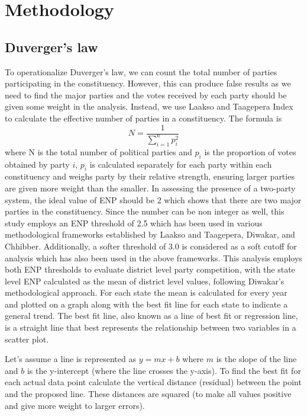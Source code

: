 \section{Methodology}
\subsection{Duverger's law}
To operationalize Duverger's law, we can count the total number of parties participating in the constituency. However, this can produce false results as we need to find the major parties and the votes received by each party should be given some weight in the analysis. Instead, we use Laakso and Taagepera Index \citep{laakso1979effective} to calculate the effective number of parties in a constituency. The formula is
\begin{equation*}
N = \frac{1}{\sum_{i=1}^{n} p_i^2}
\end{equation*}
where N is the total number of political parties and $p_i$ is the proportion of votes obtained by party $i$, $p_i$ is calculated separately for each party within each constituency and weighs party by their relative strength, ensuring larger parties are given more weight than the smaller. In assessing the presence of a two-party system, the ideal value of ENP should be 2 which shows that there are two major parties in the constituency. Since the number can be non integer as well, this study employs an ENP threshold of 2.5 which has been used in various methodological frameworks established by Laakso and Taagepera, Diwakar, and Chhibber. Additionally, a softer threshold of 3.0 is considered as a soft cutoff for analysis which has also been used in the above frameworks. This analysis employs both ENP thresholds to evaluate district level party competition, with the state level ENP calculated as the mean of district level values, following Diwakar's methodological approach. For each state the mean is calculated for every year and plotted on a graph along with the best fit line for each state to indicate a general trend. The best fit line, also known as a line of best fit or regression line, is a straight line that best represents the relationship between two variables in a scatter plot. 

\vspace{0.3cm}

Let's assume a line is represented as $y = mx + b$ where $m$ is the slope of the line and $b$ is the y-intercept (where the line crosses the y-axis). To find the best fit for each actual data point calculate the vertical distance (residual) between the point and the proposed line. These distances are squared (to make all values positive and give more weight to larger errors).

